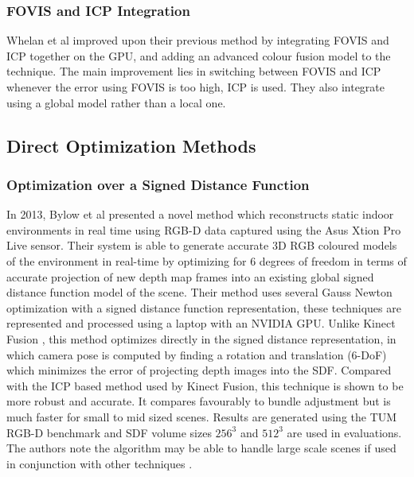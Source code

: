 \subsubsection{FOVIS and ICP Integration}

Whelan et al improved \cite{Whelan13Robust} upon their previous method \cite{Whelan12Kintinous} by integrating FOVIS and ICP together on the GPU, and adding an advanced colour fusion model to the technique. The main improvement lies in switching between FOVIS and ICP whenever the error using FOVIS is too high, ICP is used. They also integrate using a global model rather than a local one. 


\subsection{Direct Optimization Methods}

\subsubsection{Optimization over a Signed Distance Function}

In 2013, Bylow et al \cite{Bylow13Real} presented a novel method which reconstructs static indoor environments in real time using RGB-D data captured using the Asus Xtion Pro Live sensor. Their system is able to generate accurate 3D RGB coloured models of the environment in real-time by optimizing for 6 degrees of freedom in terms of accurate projection of new depth map frames into an existing global signed distance function model of the scene. Their method uses several Gauss Newton optimization with a signed distance function representation, these techniques are represented and processed using a laptop with an NVIDIA GPU. Unlike Kinect Fusion \cite{Newcombe11Kinectfusion}, this method optimizes directly in the signed distance representation, in which camera pose is computed by finding a rotation and translation (6-DoF) which minimizes the error of projecting depth images into the SDF. Compared with the ICP based method used by Kinect Fusion, this technique is shown to be more robust and accurate. It compares favourably to bundle adjustment but is much faster for small to mid sized scenes. Results are generated using the TUM RGB-D benchmark and SDF volume sizes $256^3$ and $512^3$ are used in evaluations. The authors note the algorithm may be able to handle large scale scenes if used in conjunction with other techniques \cite{Kaess11Isam2,Kummerle11G}. \\


